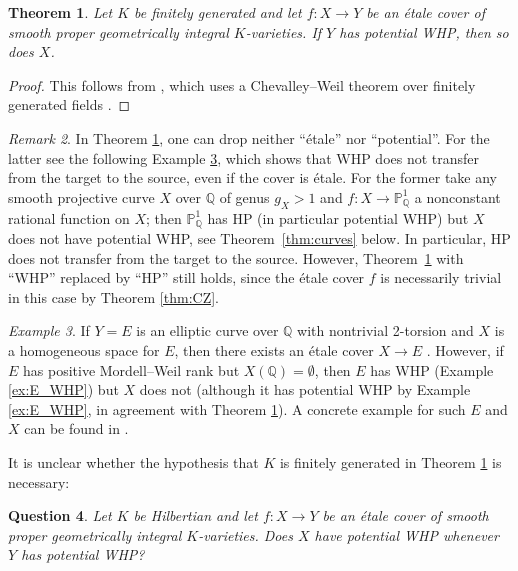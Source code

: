 \documentclass[10pt,a4paper]{amsart}
\theoremstyle{plain}
\newtheorem{theorem}{Theorem}
\newtheorem{question}[theorem]{Question}
\theoremstyle{remark}
\newtheorem{remark}[theorem]{Remark}
\newtheorem{example}[theorem]{Example}
\numberwithin{theorem}{section}
\begin{document}
\begin{theorem}\label{thm:up}
Let $K$ be finitely generated 
and let $f\colon X\rightarrow Y$ be an \'etale cover of smooth proper geometrically integral $K$-varieties.
If $Y$ has potential WHP, then so does $X$.
\end{theorem}

\begin{proof}
This follows from \cite[Theorem 3.16]{CDJLZ},
which uses a Chevalley--Weil theorem over finitely generated fields \cite[Theorem 3.8]{CDJLZ}.
\end{proof}

\begin{remark} 
In Theorem \ref{thm:up}, one can drop neither ``étale'' nor ``potential''. 
For the latter see the following Example \ref{ex:torsor_of_elliptic_curve},
which shows that WHP does not transfer from the target to the source, even if the cover is étale.
For the former take any smooth projective curve $X$ over $\mathbb{Q}$ of genus $g_X>1$ and $f\colon X\rightarrow\mathbb{P}^1_\mathbb{Q}$ a nonconstant rational function on $X$; then  
$\mathbb{P}^1_\mathbb{Q}$ has HP (in particular potential WHP) but $X$ does not have potential WHP, see Theorem~\ref{thm:curves} below.
In particular, HP does not transfer from the target to the source.
However, Theorem~\ref{thm:up} with ``WHP'' replaced by ``HP'' still holds,
since the étale cover $f$ is necessarily trivial in this case by Theorem \ref{thm:CZ}.
\end{remark}
 
\begin{example}\label{ex:torsor_of_elliptic_curve}
If $Y=E$ is an elliptic curve over $\mathbb{Q}$ with nontrivial 2-torsion
and $X$ is a homogeneous space for $E$,
then there exists an \'etale cover $X\rightarrow E$ \cite[Proposition X.4.9]{Silverman}.
However, if $E$ has positive Mordell--Weil rank but $X(\mathbb{Q})=\emptyset$,
then $E$ has WHP (Example \ref{ex:E_WHP}) but $X$ does not
(although it has potential WHP by Example \ref{ex:E_WHP}, in agreement with Theorem \ref{thm:up}).
A concrete example for such $E$ and $X$ can be found in \cite[Example X.4.10]{Silverman}.
\end{example}
 
It is unclear whether the hypothesis that $K$ is finitely generated in Theorem \ref{thm:up} is necessary:

\begin{question} 
Let $K$ be Hilbertian
and let $f\colon X\to Y$ be an \'etale cover of smooth proper geometrically integral $K$-varieties.
Does $X$ have potential WHP whenever $Y$ has potential WHP?
\end{question}
 
\end{document}
